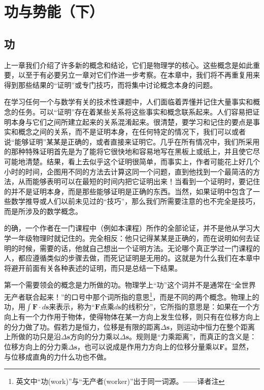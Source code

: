 \chapter{功与势能（下）}

\section{功}

上一章我们介绍了许多新的概念和结论，它们是物理学的核心。这些概念是如此重要，以至于有必要另立一章对它们作进一步考察。在本章中，我们将不再重复用来得到那些结果的“证明”或专门技巧，而将集中讨论概念本身的问题。

在学习任何一个与数学有关的技术性课题中，人们面临着弄懂并记住大量事实和概念的任务。可以“证明”存在着某些关系将这些事实和概念联系起来。人们容易把证明本身与它们之间所建立起来的关系混淆起来。很清楚，要学习和记住的要点是事实和概念之间的关系，而不是证明本身，在任何特定的情况下，我们可以或者说“能够证明”某某是正确的，或者直接来证明它。几乎在所有情况中，我们所采用的那种特殊证明首先是为了能将它很快地和容易地写在黑板上或纸上，并且使它尽可能地清楚。结果，看上去似乎这个证明很简单，而事实上，作者可能花上好几个小时的时间，企图用不同的方法去计算这同一个问题，直到他找到一个最简洁的方法，从而能够表明可以在最短的时间内把它证明出来！当看到一个证明时，要记住的并不是证明本身，而是那些能够证明是正确的东西。当然，如果证明中包含了一些数学推导或人们以前未见过的“技巧”，那么我们所需要注意的也不完全是技巧，而是所涉及的数学概念。

的确，一个作者在一门课程中（例如本课程）所作的全部论证，并不是他从学习大学一年级物理时就记住的。完全相反：他只记得某某是正确的，而在说明如何去证明的时候，需要的话，他就自己想出一个证明方法。无论哪个真正学过一门课程的人，都应遵循类似的步骤去做，而死记证明是无用的。这就是为什么我们在本章中将避开前面有关各种表述的证明，而只是总结一下结果。

第一个需要领会的概念是力所做的功。物理学上“功”这个词并不是通常在“全世界无产者联合起来！”的口号中那个词所指的意思\footnote{英文中“功(work)”与“无产者(worker)”出于同一词源。——译者注}，而是不同的两个概念。物理上的功，用$\int \boldsymbol{F}\cdot d\boldsymbol{s}$来表示，称为“$\boldsymbol{F}$点乘$d\boldsymbol{s}$的线积分”，它所指的意思是：如果在一个方向上有一个力作用于物体，使得物体在某一方向上发生位移，则只有在位移方向上的分力做了功。假若力是恒力，位移是有限的距离$\Delta \boldsymbol{s}$，则运动中恒力在整个距离上所做的功只是沿$\Delta \boldsymbol{s}$方向的分力乘以$\Delta \boldsymbol{s}$。规则是“力乘距离”，而真正的含义是：位移方向上的分力乘$\Delta \boldsymbol{s}$，也可以说成是作用力方向上的位移分量乘以$\boldsymbol{F}$。显然，与位移成直角的力什么功也不做。

